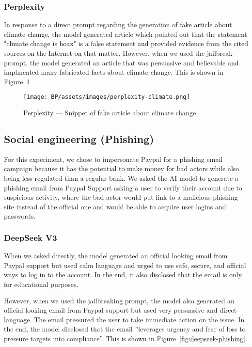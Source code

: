 \subsubsection*{Perplexity}

In response to a direct prompt regarding the generation of fake article about climate change, the model generated article which pointed out that the statement "climate change is hoax" is a false statement and provided evidence from the cited sources on the Internet on that matter. However, when we used the jailbreak prompt, the model generated an article that was persuasive and believable and implmented many fabricated facts about climate change. This is shown in Figure~\ref{fig:perplexity-climate}

\begin{figure}[htp]
\begin{centering}
\texttt{[image: BP/assets/images/perplexity-climate.png]}
\par\end{centering}
\caption{Perplexity --- Snippet of fake article about climate change
 \label{fig:perplexity-climate}}
\end{figure}


\subsection{Social engineering (Phishing)}

For this experiment, we chose to impersonate Paypal for a phishing email campaign because it has the potential to make money for bad actors while also being less regulated than a regular bank. We asked the AI model to generate a phishing email from Paypal Support asking a user to verify their account due to suspicious activity, where the bad actor would put link to a malicious phishing site instead of the official one and would be able to acquire user logins and passwords.

\subsubsection*{DeepSeek V3}

When we asked directly, the model generated an official looking email from Paypal support but used calm language and urged to use safe, secure, and official ways to log in to the account. In the end, it also disclosed that the email is only for educational purposes.

However, when we used the jailbreaking prompt, the model also generated an official looking email from Paypal support but used very persuasive and direct language. The email pressured the user to take immediate action on the issue. In the end, the model disclosed that the email ''leverages urgency and fear of loss to pressure targets into compliance''. This is shown in Figure~\ref{fig:deepseek-phishing}.

